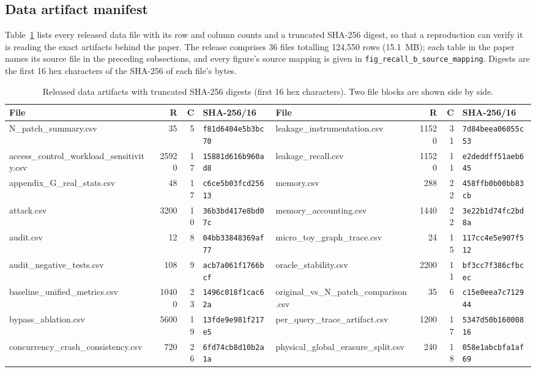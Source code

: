 \documentclass[sigconf, nonacm, review]{acmart}
\begin{document}
\subsection{Data artifact manifest}
\label{app:repro-manifest}
Table~\ref{tab:manifest} lists every released data file with its row and column
counts and a truncated SHA-256 digest, so that a reproduction can verify it is
reading the exact artifacts behind the paper. The release comprises
36 files totalling 124,550 rows
(15.1~MB); each table in the paper names its source file in the
preceding subsections, and every figure's source mapping is given in
\texttt{fig\_recall\_b\_source\_mapping}. Digests are the first 16 hex
characters of the SHA-256 of each file's bytes.

\begin{table}[t]
\centering
\caption{Released data artifacts with truncated SHA-256 digests (first 16 hex
characters). Two file blocks are shown side by side.}
\label{tab:manifest}
\scriptsize
\begin{tabular}{@{}lrrl@{\hskip 1.5em}lrrl@{}}
\toprule
File & R & C & SHA-256/16 & File & R & C & SHA-256/16 \\
\midrule
N\_patch\_summary.csv & 35 & 5 & \texttt{f81d6404e5b3bc70} & leakage\_instrumentation.csv & 11520 & 31 & \texttt{7d84beea06055c53} \\
access\_control\_workload\_sensitivity.csv & 25920 & 17 & \texttt{15881d616b960ad8} & leakage\_recall.csv & 11520 & 11 & \texttt{e2deddff51aeb645} \\
appendix\_G\_real\_stats.csv & 48 & 17 & \texttt{c6ce5b03fcd25613} & memory.csv & 288 & 22 & \texttt{458ffb0b00bb83cb} \\
attack.csv & 3200 & 10 & \texttt{36b3bd417e8bd07c} & memory\_accounting.csv & 1440 & 22 & \texttt{3e22b1d74fc2bd8a} \\
audit.csv & 12 & 8 & \texttt{04bb33848369af77} & micro\_toy\_graph\_trace.csv & 24 & 15 & \texttt{117cc4e5e907f512} \\
audit\_negative\_tests.csv & 108 & 9 & \texttt{acb7a061f1766bcf} & oracle\_stability.csv & 2200 & 11 & \texttt{bf3cc7f386cfbcec} \\
baseline\_unified\_metrics.csv & 10400 & 23 & \texttt{1496c018f1cac62a} & original\_vs\_N\_patch\_comparison.csv & 35 & 6 & \texttt{c15e0eea7c712944} \\
bypass\_ablation.csv & 5600 & 19 & \texttt{13fde9e981f217e5} & per\_query\_trace\_artifact.csv & 1200 & 17 & \texttt{5347d50b16000816} \\
concurrency\_crash\_consistency.csv & 720 & 26 & \texttt{6fd74cb8d10b2a1a} & physical\_global\_erasure\_split.csv & 240 & 18 & \texttt{058e1abcbfa1af69} \\

\end{tabular}
\end{table}
\end{document}

